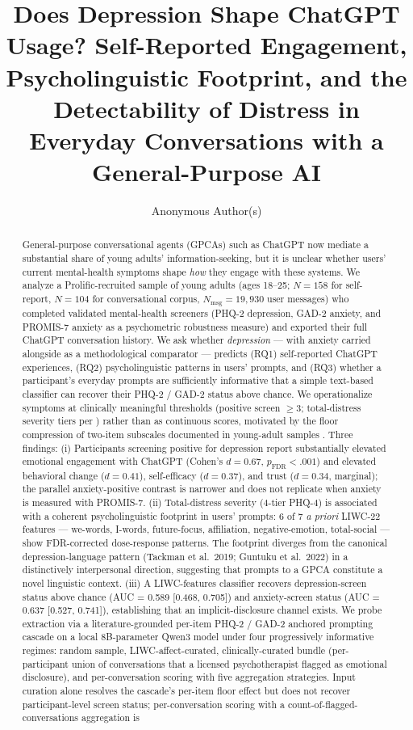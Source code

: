 \documentclass[letterpaper]{article}
\title{Does Depression Shape ChatGPT Usage? Self-Reported Engagement, Psycholinguistic Footprint, and the Detectability of Distress in Everyday Conversations with a General-Purpose AI}
\author{
    Anonymous Author(s)
}
\begin{document}
\maketitle

\begin{abstract}
General-purpose conversational agents (GPCAs) such as ChatGPT now mediate a substantial share of young adults' information-seeking, but it is unclear whether users' current mental-health symptoms shape \emph{how} they engage with these systems. We analyze a Prolific-recruited sample of young adults (ages 18--25; $N=158$ for self-report, $N=104$ for conversational corpus, $N_{\mathrm{msg}}=19{,}930$ user messages) who completed validated mental-health screeners (PHQ-2 depression, GAD-2 anxiety, and PROMIS-7 anxiety as a psychometric robustness measure) and exported their full ChatGPT conversation history. We ask whether \emph{depression} --- with anxiety carried alongside as a methodological comparator --- predicts (RQ1) self-reported ChatGPT experiences, (RQ2) psycholinguistic patterns in users' prompts, and (RQ3) whether a participant's everyday prompts are sufficiently informative that a simple text-based classifier can recover their PHQ-2 / GAD-2 status above chance. We operationalize symptoms at clinically meaningful thresholds (positive screen $\geq 3$; total-distress severity tiers per \citet{lowe2010phq4}) rather than as continuous scores, motivated by the floor compression of two-item subscales documented in young-adult samples \citep{mavrogiorgou2025collabra}. Three findings: (i) Participants screening positive for depression report substantially elevated emotional engagement with ChatGPT (Cohen's $d=0.67$, $p_{\mathrm{FDR}}<.001$) and elevated behavioral change ($d=0.41$), self-efficacy ($d=0.37$), and trust ($d=0.34$, marginal); the parallel anxiety-positive contrast is narrower and does not replicate when anxiety is measured with PROMIS-7. (ii) Total-distress severity (4-tier PHQ-4) is associated with a coherent psycholinguistic footprint in users' prompts: 6 of 7 \emph{a priori} LIWC-22 features --- we-words, I-words, future-focus, affiliation, negative-emotion, total-social --- show FDR-corrected dose-response patterns. The footprint diverges from the canonical depression-language pattern (Tackman et al.\ 2019; Guntuku et al.\ 2022) in a distinctively interpersonal direction, suggesting that prompts to a GPCA constitute a novel linguistic context. (iii) A LIWC-features classifier recovers depression-screen status above chance (AUC = 0.589 [0.468, 0.705]) and anxiety-screen status (AUC = 0.637 [0.527, 0.741]), establishing that an implicit-disclosure channel exists. We probe extraction via a literature-grounded per-item PHQ-2 / GAD-2 anchored prompting cascade \citep{galatzer2025llamadrs} on a local 8B-parameter Qwen3 model under four progressively informative regimes: random sample, LIWC-affect-curated, clinically-curated bundle (per-participant union of conversations that a licensed psychotherapist flagged as emotional disclosure), and per-conversation scoring with five aggregation strategies. Input curation alone resolves the cascade's per-item floor effect but does not recover participant-level screen status; per-conversation scoring with a count-of-flagged-conversations aggregation is 
\end{abstract}
\end{document}
